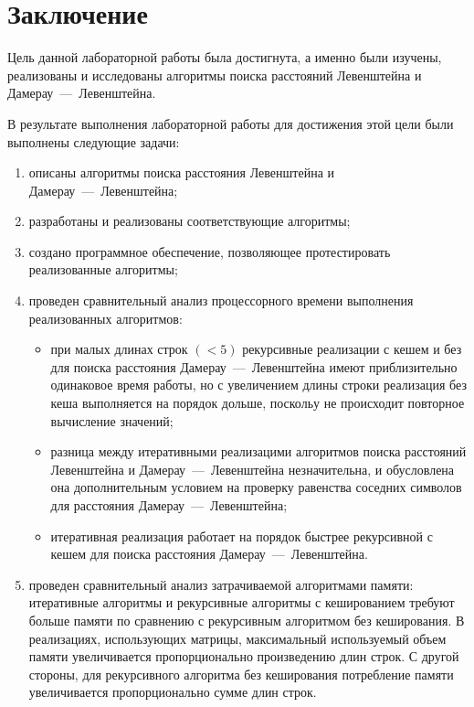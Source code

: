 \chapter*{Заключение}

Цель данной лабораторной работы была достигнута, а именно были изучены, реализованы и исследованы алгоритмы поиска расстояний Левенштейна и Дамерау~---~Левенштейна.

В результате выполнения лабораторной работы для достижения этой цели были выполнены следующие задачи:
\begin{enumerate}
    \item описаны алгоритмы поиска расстояния Левенштейна и Дамерау~---~Левенштейна;
    \item разработаны и реализованы соответствующие алгоритмы;
    \item создано программное обеспечение, позволяющее протестировать реализованные алгоритмы;
    \item проведен сравнительный анализ процессорного времени выполнения реализованных алгоритмов:
    \begin{itemize}
        \item при малых длинах строк $(< 5)$ рекурсивные реализации с кешем и без для поиска расстояния Дамерау~---~Левенштейна имеют приблизительно одинаковое время работы, 
	    но с увеличением длины строки реализация без кеша выполняется на порядок дольше, поскольу не происходит повторное вычисление значений;
        \item разница между итеративными реализацими алгоритмов поиска расстояний Левенштейна и Дамерау~---~Левенштейна незначительна, и обусловлена она
        дополнительным условием на проверку равенства соседних символов для расстояния Дамерау~---~Левенштейна;
        \item итеративная реализация работает на порядок быстрее рекурсивной с кешем для поиска расстояния Дамерау~---~Левенштейна.
        \end{itemize}
    \item проведен сравнительный анализ затрачиваемой алгоритмами памяти: итеративные алгоритмы и рекурсивные алгоритмы с кешированием требуют больше памяти по сравнению с рекурсивным алгоритмом без кеширования. 
    В реализациях, использующих матрицы, максимальный используемый объем памяти увеличивается пропорционально произведению длин строк. С другой стороны, для рекурсивного алгоритма без кеширования потребление памяти 
    увеличивается пропорционально сумме длин строк.
\end{enumerate}